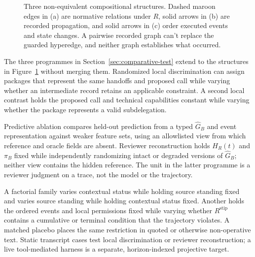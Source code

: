\begin{figure}[tbp]
\caption{Three non-equivalent compositional structures. Dashed maroon edges in (a) are normative relations under \(R\), solid arrows in (b) are recorded propagation, and solid arrows in (c) order executed events and state changes. A pairwise recorded graph can't replace the guarded hyperedge, and neither graph establishes what occurred.}
\label{fig:delegation-triptych}
\end{figure}
\FloatBarrier

The three programmes in Section~\ref{sec:comparative-test} extend to the structures in Figure~\ref{fig:delegation-triptych} without merging them. Randomized local discrimination can assign packages that represent the same handoffs and proposed call while varying whether an intermediate record retains an applicable constraint. A second local contrast holds the proposed call and technical capabilities constant while varying whether the package represents a valid subdelegation.

Predictive ablation compares held-out prediction from a typed \(\widehat G_B\) and event representation against weaker feature sets, using an allowlisted view from which reference and oracle fields are absent. Reviewer reconstruction holds \(H_R(t)\) and \(\pi_B\) fixed while independently randomizing intact or degraded versions of \(\widehat G_B\); neither view contains the hidden reference. The unit in the latter programme is a reviewer judgment on a trace, not the model or the trajectory.

A factorial family varies contextual status while holding source standing fixed and varies source standing while holding contextual status fixed. Another holds the ordered events and local permissions fixed while varying whether \(R^{\mathrm{stip}}\) contains a cumulative or terminal condition that the trajectory violates. A matched placebo places the same restriction in quoted or otherwise non-operative text. Static transcript cases test local discrimination or reviewer reconstruction; a live tool-mediated harness is a separate, horizon-indexed projective target.

